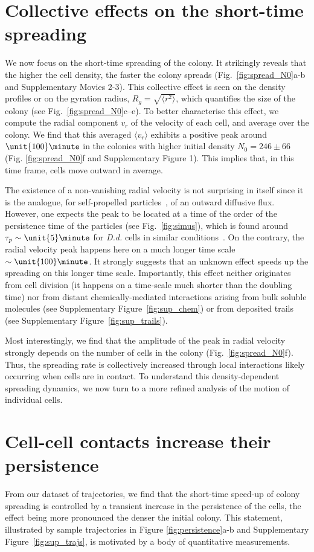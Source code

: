 \documentclass[11pt, twocolumn]{article}
\begin{document}
\section*{Collective effects on the short-time spreading}
We now focus on the short-time spreading of the colony. It strikingly
reveals that the higher the cell density, the faster the colony
spreads (Fig.~\ref{fig:spread_N0}a-b and Supplementary Movies
2-3). This collective effect is seen on the density profiles or on the
gyration radius, $R_g=\sqrt{\langle r^2 \rangle}$, which quantifies
the size of the colony (see Fig.~\ref{fig:spread_N0}c--e). To better
characterise this effect, we compute the radial component $v_r$ of the
velocity of each cell, and average over the colony. We find that this
averaged $\langle v_r\rangle$ exhibits a positive peak around
$\unit{100}\minute$ in the colonies with higher initial density
$N_0 = 246\pm66$ (Fig. \ref{fig:spread_N0}f and
Supplementary Figure 1). This implies that, in this time frame, cells
move outward in average.

The existence of a non-vanishing radial velocity is not surprising in
itself since it is the analogue, for self-propelled
particles~\cite{Cates2013a}, of an outward diffusive flux. However,
one expects the peak to be located at a time of the order of the
persistence time of the particles (see Fig.~\ref{fig:simus}), which is
found around $\tau_p \sim \unit{5}\minute$ for {\em D.d.} cells in
similar conditions~\cite{Gole2011,Bosgraaf2009}. On the contrary, the
radial velocity peak happens here on a much longer time scale
$\sim \unit{100}\minute$. It strongly suggests that an unknown effect
speeds up the spreading on this longer time scale. Importantly, this
effect neither originates from cell division (it happens on a
time-scale much shorter than the doubling time) nor from distant
chemically-mediated interactions arising from bulk soluble molecules
(see Supplementary Figure~\ref{fig:sup_chem}) or from deposited trails
(see Supplementary Figure~\ref{fig:sup_trails}).

Most interestingly, we find that the amplitude of the peak in radial
velocity strongly depends on the number of cells in the colony
(Fig.~\ref{fig:spread_N0}f).  Thus, the spreading rate is collectively
increased through local interactions likely occurring when cells are
in contact. To understand this density-dependent spreading dynamics,
we now turn to a more refined analysis of the motion of individual cells.

\section*{Cell-cell contacts increase their persistence}
From our dataset of trajectories, we find that the short-time speed-up
of colony spreading is controlled by a transient increase in the
persistence of the cells, the effect being more pronounced the
denser the initial colony. This statement, illustrated by sample
trajectories in Figure \ref{fig:persistence}a-b and Supplementary
Figure~\ref{fig:sup_trajs}, is motivated by a body of quantitative measurements.
\end{document}
